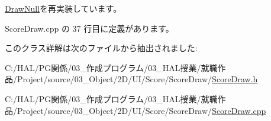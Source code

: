 \mbox{\hyperlink{class_draw_null_a6e81d63efab7333e8d0e8af99362a4d9}{Draw\+Null}}を再実装しています。



 Score\+Draw.\+cpp の 37 行目に定義があります。



このクラス詳解は次のファイルから抽出されました\+:\begin{DoxyCompactItemize}
\item 
C\+:/\+H\+A\+L/\+P\+G関係/03\+\_\+作成プログラム/03\+\_\+\+H\+A\+L授業/就職作品/\+Project/source/03\+\_\+\+Object/2\+D/\+U\+I/\+Score/\+Score\+Draw/\mbox{\hyperlink{_score_draw_8h}{Score\+Draw.\+h}}\item 
C\+:/\+H\+A\+L/\+P\+G関係/03\+\_\+作成プログラム/03\+\_\+\+H\+A\+L授業/就職作品/\+Project/source/03\+\_\+\+Object/2\+D/\+U\+I/\+Score/\+Score\+Draw/\mbox{\hyperlink{_score_draw_8cpp}{Score\+Draw.\+cpp}}\end{DoxyCompactItemize}
